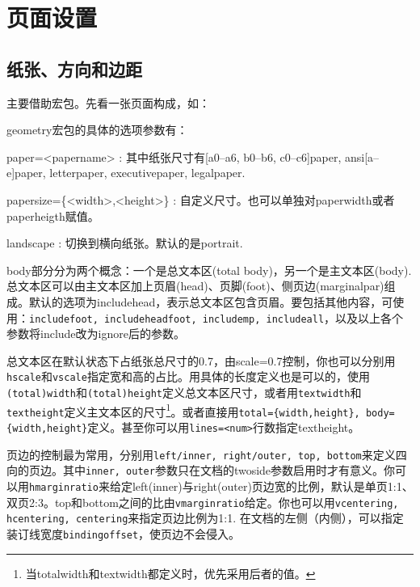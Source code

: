 \section{页面设置}
\label{sec:geometry}
\subsection{纸张、方向和边距}
主要借助宏包。先看一张页面构成，如：
\begin{figure}
\centering

\label{fig:geo-paper}
\end{figure}

geometry宏包的具体的选项参数有：
\begin{para}
\item[paper=<papername>]: 其中纸张尺寸有[a0--a6, b0--b6, c0--c6]paper, ansi[a--e]paper, letterpaper, executivepaper, legalpaper.
\item[papersize=\{<width>,<height>\}]: 自定义尺寸。也可以单独对paperwidth或者paperheigth赋值。
\item[landscape]: 切换到横向纸张。默认的是portrait.
\end{para}

body部分分为两个概念：一个是总文本区(total body)，另一个是主文本区(body). 总文本区可以由主文本区加上页眉(head)、页脚(foot)、侧页边(marginalpar)组成。默认的选项为includehead，表示总文本区包含页眉。要包括其他内容，可使用：\texttt{includefoot, includeheadfoot, includemp, includeall}，以及以上各个参数将include改为ignore后的参数。

总文本区在默认状态下占纸张总尺寸的0.7，由scale=0.7控制，你也可以分别用\texttt{hscale}和\texttt{vscale}指定宽和高的占比。用具体的长度定义也是可以的，使用\texttt{(total)width}和\texttt{(total)height}定义总文本区尺寸，或者用\texttt{textwidth}和\texttt{textheight}定义主文本区的尺寸\footnote{当totalwidth和textwidth都定义时，优先采用后者的值。}。或者直接用\texttt{total=\{width,height\}, body=\{width,height\}}定义。甚至你可以用\texttt{lines=<num>}行数指定textheight。

页边的控制最为常用，分别用\texttt{left/inner, right/outer, top, bottom}来定义四向的页边。其中\texttt{inner, outer}参数只在文档的twoside参数启用时才有意义。你可以用\texttt{hmarginratio}来给定left(inner)与right(outer)页边宽的比例，默认是单页1:1、双页2:3。top和bottom之间的比由\texttt{vmarginratio}给定。你也可以用\texttt{vcentering, hcentering, centering}来指定页边比例为1:1. 在文档的左侧（内侧），可以指定装订线宽度\texttt{bindingoffset}，使页边不会侵入。

